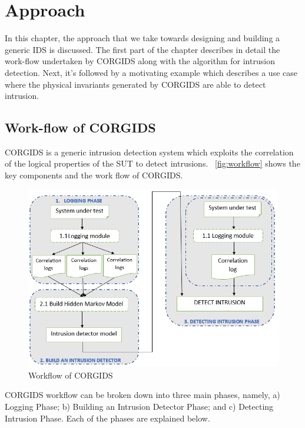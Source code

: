 
\chapter{\textbf{Approach}}
\label{sec3:Approach}

In this chapter, the approach that we take towards designing and building a generic \ac{IDS} is discussed. The first part of the chapter describes in detail the work-flow undertaken by \ac{CORGIDS} along with the algorithm for intrusion detection. Next, it's followed by a motivating example which describes a use case where the physical invariants generated by \ac{CORGIDS} are able to detect intrusion.


\section{Work-flow of CORGIDS}
\ac{CORGIDS} is a generic intrusion detection system which exploits the correlation of the logical properties of the \ac{SUT} to detect intrusions. ~\autoref{fig:workflow} shows the key components and the work flow of \ac{CORGIDS}.

\begin{figure}[ht]
    \centering
    \includegraphics[scale=0.65,keepaspectratio = true]{Graphics/CORGIDSWorkflowNew.png}
    \caption{Workflow of CORGIDS}
    \label{fig:workflow}
\end{figure}

\ac{CORGIDS} workflow can be broken down into three main phases, namely, a) Logging Phase; b) Building an Intrusion Detector Phase; and c) Detecting Intrusion Phase. Each of the phases are explained below.

